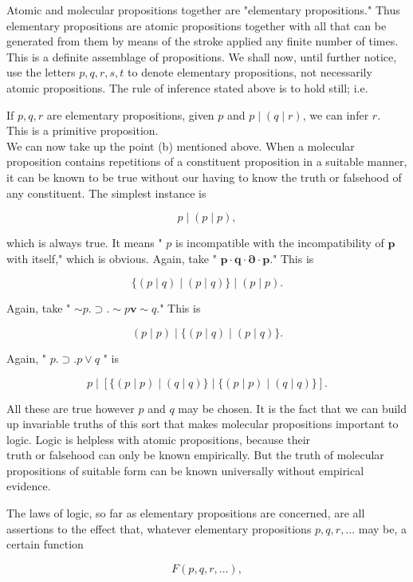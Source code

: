 \documentclass[10pt]{article}
\begin{document}
Atomic and molecular propositions together are "elementary propositions." Thus elementary propositions are atomic propositions together with all that can be generated from them by means of the stroke applied any finite number of times. This is a definite assemblage of propositions. We shall now, until further notice, use the letters $p, q, r, s, t$ to denote elementary propositions, not necessarily atomic propositions. The rule of inference stated above is to hold still; i.e.

If $p, q, r$ are elementary propositions, given $p$ and $p \mid(q \mid r)$, we can infer $r$.\\
This is a primitive proposition.\\
We can now take up the point (b) mentioned above. When a molecular proposition contains repetitions of a constituent proposition in a suitable manner, it can be known to be true without our having to know the truth or falsehood of any constituent. The simplest instance is

$$
p \mid(p \mid p),
$$

which is always true. It means " $p$ is incompatible with the incompatibility of $\boldsymbol{p}$ with itself," which is obvious. Again, take " $\boldsymbol{p} \cdot \boldsymbol{q} \cdot \boldsymbol{\partial} \cdot \boldsymbol{p}$." This is

$$
\{(p \mid q) \mid(p \mid q)\} \mid(p \mid p) .
$$

Again, take " $\sim p . \supset . \sim p \mathbf{v} \sim q$." This is

$$
(p \mid p) \mid\{(p \mid q) \mid(p \mid q)\} .
$$

Again, " $p . \supset . p \vee q$ " is

$$
p \mid[\{(p \mid p) \mid(q \mid q)\} \mid\{(p \mid p) \mid(q \mid q)\}] .
$$

All these are true however $p$ and $q$ may be chosen. It is the fact that we can build up invariable truths of this sort that makes molecular propositions important to logic. Logic is helpless with atomic propositions, because their\\
truth or falsehood can only be known empirically. But the truth of molecular propositions of suitable form can be known universally without empirical evidence.

The laws of logic, so far as elementary propositions are concerned, are all assertions to the effect that, whatever elementary propositions $p, q, r, \ldots$ may be, a certain function

$$
F(p, q, r, \ldots),
$$
\end{document}

